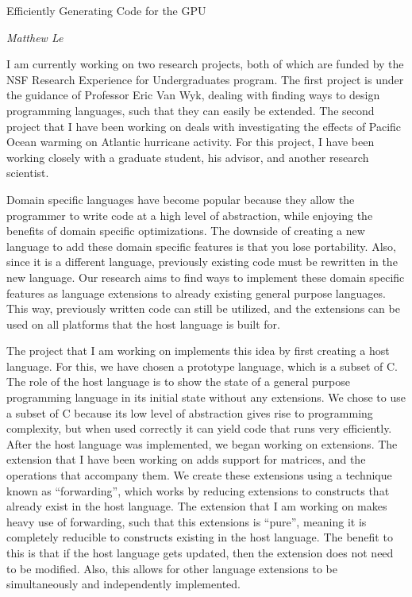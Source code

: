 \documentclass[a4paper,12pt]{article}
\begin{document}
\begin{center}
{\Large Efficiently Generating Code for the GPU}

\emph{Matthew Le}
\end{center}

I am currently working on two research projects, both of which are funded by the NSF Research Experience for Undergraduates program. The first project is under the guidance of Professor Eric Van Wyk, dealing with finding ways to design programming languages, such that they can easily be extended. The second project that I have been working on deals with investigating the effects of Pacific Ocean warming on Atlantic hurricane activity. For this project, I have been working closely with a graduate student, his advisor, and another research scientist.  

Domain specific languages have become popular because they allow the programmer to write code at a high level of abstraction, while enjoying the benefits of domain specific optimizations. The downside of creating a new language to add these domain specific features is that you lose portability. Also, since it is a different language, previously existing code must be rewritten in the new language. Our research aims to find ways to implement these domain specific features as language extensions to already existing general purpose languages. This way, previously written code can still be utilized, and the extensions can be used on all platforms that the host language is built for.  

The project that I am working on implements this idea by first creating a host language. For this, we have chosen a prototype language, which is a subset of C. The role of the host language is to show the state of a general purpose programming language in its initial state without any extensions.  We chose to use a subset of C because its low level of abstraction gives rise to programming complexity, but when used correctly it can yield code that runs very efficiently. After the host language was implemented, we began working on extensions. The extension that I have been working on adds support for matrices, and the operations that accompany them. We create these extensions using a technique known as ``forwarding'', which works by reducing extensions to constructs that already exist in the host language.  The extension that I am working on makes heavy use of forwarding, such that this extensions is ``pure'', meaning it is completely reducible to constructs existing in the host language.  The benefit to this is that if the host language gets updated, then the extension does not need to be modified.  Also, this allows for other language extensions to be simultaneously and independently implemented.
\end{document}
